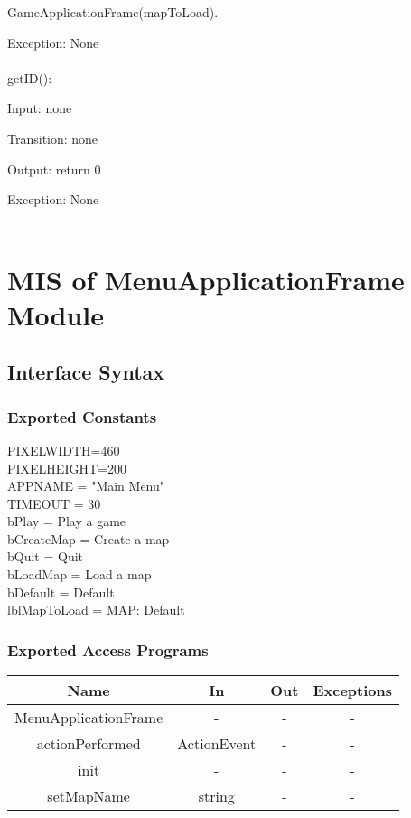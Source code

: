 \documentclass[12,english]{article}
\begin{document}
		GameApplicationFrame(mapToLoad).
		
		Exception: None\\
		\\
		getID():
		
		Input: none
		
		Transition: none
		
		Output: return 0
		
		Exception: None\\
		\\	
\section{MIS of MenuApplicationFrame Module}
	\subsection{Interface Syntax}
	    \subsubsection{Exported Constants}
	    PIXELWIDTH=460\\
	    PIXELHEIGHT=200\\
	    APPNAME = "Main Menu"\\
	    TIMEOUT = 30\\
	    bPlay = Play a game\\
	    bCreateMap = Create a map\\
	    bQuit = Quit\\
	    bLoadMap = Load a map\\
	    bDefault = Default\\
	    lblMapToLoad = MAP: Default\\
		\subsubsection{Exported Access Programs}
		
	\begin{tabular}[pos]{|c|c|c|c|}
	\hline
	\textbf{Name}& \textbf{In} & \textbf{Out} & \textbf{Exceptions} \\ 
	\hline
	MenuApplicationFrame & - & - & - \\ \hline
	actionPerformed & ActionEvent& - & - \\ \hline
	init & - & - & - \\ \hline
	setMapName & string & - & - \\ \hline
	
	
					
	\end{tabular}		
		
\end{document}
